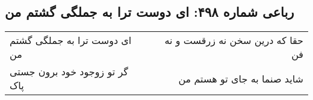 \begin{center}
\section*{رباعی شماره ۴۹۸: ای دوست ترا به جملگی گشتم من}
\label{sec:sh498}
\begin{longtable}{l p{0.5cm} r}
ای دوست ترا به جملگی گشتم من
&&
حقا که درین سخن نه زرقست و نه فن
\\
گر تو زوجود خود برون جستی پاک
&&
شاید صنما به جای تو هستم من
\\
\end{longtable}
\end{center}
